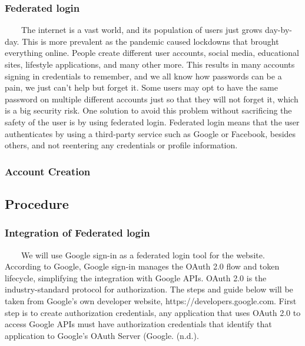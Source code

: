 \subsubsection{Federated login}
~~~~The internet is a vast world, and its population of users just grows day-by-day. This is more prevalent as the pandemic caused lockdowns that brought everything online. People create different user accounts, social media, educational sites, lifestyle applications, and many other more. This results in many accounts signing in credentials to remember, and we all know how passwords can be a pain, we just can't help but forget it. Some users may opt to have the same password on multiple different accounts just so that they will not forget it, which is a big security risk. One solution to avoid this problem without sacrificing the safety of the user is by using federated login. Federated login means that the user authenticates by using a third-party service such as Google or Facebook, besides others, and not reentering any credentials or profile information.

\subsubsection{Account Creation}

\subsection{Procedure}
\subsubsection{Integration of Federated login}
~~~~We will use Google sign-in as a federated login tool for the website. According to Google, Google sign-in manages the OAuth 2.0 flow and token lifecycle, simplifying the integration with Google APIs. OAuth 2.0 is the industry-standard protocol for authorization. The steps and guide below will be taken from Google’s own developer website, https://developers.google.com.
First step is to create authorization credentials, any application that uses OAuth 2.0 to access Google APIs must have authorization credentials that identify that application to Google’s OAuth Server (Google. (n.d.).

